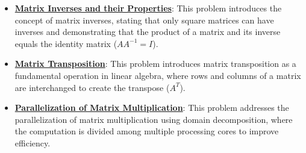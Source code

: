 \documentclass{article}%
\begin{document}
\begin{itemize}[leftmargin=*]
\item \href{https://purdue.brightspace.com/d2l/common/assets/pdfjs-d2l-dist/1.0.14-legacy/web/viewer.html?file=\%2Fcontent\%2Fenforced\%2F1095467-wl.202510.CS.24300.001\%2F04L1-Linear Algebra Primer.pdf\%3Fou\%3D1095467\&lang=en-us\&container=d2l-fileviewer-rendered-pdf\&fullscreen=d2l-fileviewer-rendered-pdf-dialog\&height=667#page=10}{\textbf{Matrix Inverses and their Properties}}: This problem introduces the concept of matrix inverses, stating that only square matrices can have inverses and demonstrating that the product of a matrix and its inverse equals the identity matrix ($AA^{-1} = I$).%
\item \href{https://purdue.brightspace.com/d2l/common/assets/pdfjs-d2l-dist/1.0.14-legacy/web/viewer.html?file=\%2Fcontent\%2Fenforced\%2F1095467-wl.202510.CS.24300.001\%2F04L1-Linear Algebra Primer.pdf\%3Fou\%3D1095467\&lang=en-us\&container=d2l-fileviewer-rendered-pdf\&fullscreen=d2l-fileviewer-rendered-pdf-dialog\&height=667#page=16}{\textbf{Matrix Transposition}}: This problem introduces matrix transposition as a fundamental operation in linear algebra, where rows and columns of a matrix are interchanged to create the transpose ($A^T$).%
\item \href{https://purdue.brightspace.com/d2l/common/assets/pdfjs-d2l-dist/1.0.14-legacy/web/viewer.html?file=\%2Fcontent\%2Fenforced\%2F1095467-wl.202510.CS.24300.001\%2F04L1-Linear Algebra Primer.pdf\%3Fou\%3D1095467\&lang=en-us\&container=d2l-fileviewer-rendered-pdf\&fullscreen=d2l-fileviewer-rendered-pdf-dialog\&height=667#page=18}{\textbf{Parallelization of Matrix Multiplication}}: This problem addresses the parallelization of matrix multiplication using domain decomposition, where the computation is divided among multiple processing cores to improve efficiency.%
\end{itemize}

%
\end{document}
